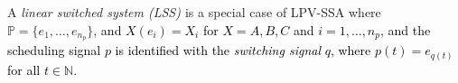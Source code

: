 \documentclass[journal,twoside,web]{ieeecolor}
\newtheorem{Remark}[Theorem]{Remark}
\begin{document}
A \emph{linear switched system (LSS) \cite{Sun:Book,D:Lib}} is a special case of LPV-SSA where $\mathbb{P} = \{e_1, \ldots, e_{n_p}\}$,
 \textcolor{black}{and  $X(e_i) = X_i$ for $X = A, B, C$ and $i = 1, \ldots, n_p$, and the scheduling signal $p$ is identified with the
  \emph{switching signal} $q$, where $p(t) = e_{q(t)}$ for all $t \in \mathbb{N}$.  }
\end{document}
